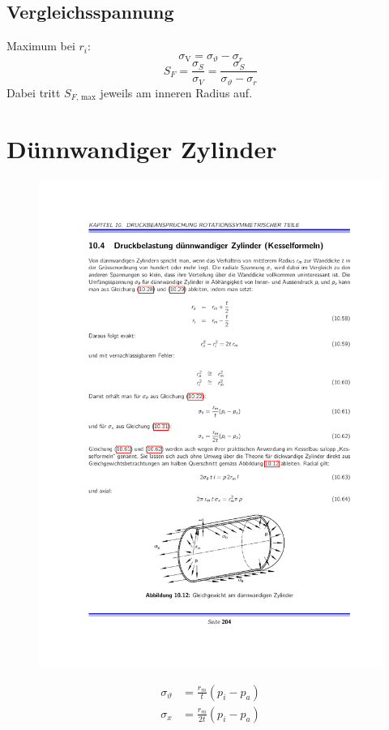 	\subsection{Vergleichsspannung} %
		Maximum bei $r_i$:
		\begin{equation*}
			\sigma_{\text{V}} = \sigma_\vartheta - \sigma_r
		\end{equation*}
		\begin{equation*}
			S_F = \frac{\sigma_S}{\sigma_V} = \frac{\sigma_S}{\sigma_\vartheta - \sigma_r}
		\end{equation*}
		Dabei tritt $S_{F\text{, max}}$ jeweils am inneren Radius auf.
\section{Dünnwandiger Zylinder} %
	\begin{figure}
		\vspace{-1cm}
		\includegraphics[width=.65\columnwidth]{graphics/duennwandig}
	\end{figure}
	{
		\setlength{\mathindent}{.5\mathindent}
		\begin{align*}
			\sigma_\vartheta &= \frac{r_m}{t}(p_i - p_a) \\
			\sigma_x &= \frac{r_m}{2t}(p_i-p_a)
		\end{align*}
	}
